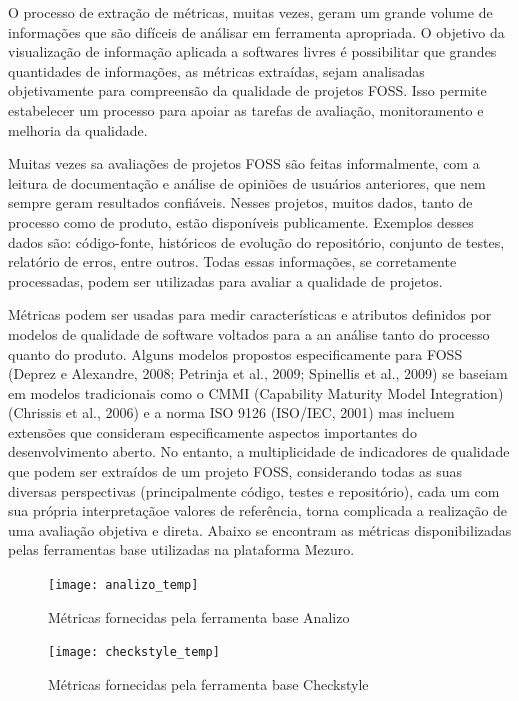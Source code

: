 O processo de extração de métricas, muitas vezes, geram um grande volume de informações que são difíceis de análisar em ferramenta apropriada. O objetivo da visualização de informação aplicada a softwares livres é possibilitar que grandes quantidades de informações, as métricas extraídas, sejam analisadas objetivamente para compreensão da qualidade de projetos FOSS. Isso permite estabelecer um processo para apoiar as tarefas de avaliação, monitoramento e melhoria da qualidade.

Muitas vezes sa avaliações de projetos FOSS são feitas informalmente, com a leitura de documentação e análise de opiniões de usuários anteriores, que nem sempre geram resultados confiáveis. Nesses projetos, muitos dados, tanto de processo como de produto, estão disponíveis publicamente. Exemplos desses dados são: código-fonte, históricos de evolução do repositório, conjunto de testes, relatório de erros, entre outros. Todas essas informações, se corretamente processadas, podem ser utilizadas para avaliar a qualidade de projetos. 

Métricas podem ser usadas para medir características e atributos definidos por modelos de qualidade de software voltados para a an análise tanto do processo quanto do produto. Alguns modelos propostos especificamente para FOSS (Deprez e Alexandre, 2008; Petrinja et al., 2009; Spinellis et al., 2009) se baseiam em modelos tradicionais como o CMMI (Capability Maturity Model Integration) (Chrissis et al., 2006) e a norma ISO 9126 (ISO/IEC, 2001) mas incluem extensões que consideram especificamente aspectos importantes do desenvolvimento aberto. No entanto, a multiplicidade de indicadores de qualidade que podem ser extraídos de um projeto FOSS, considerando todas as suas diversas perspectivas (principalmente código, testes e repositório), cada um com sua própria interpretaçãoe valores de referência, torna complicada a realização de uma avaliação objetiva e direta. Abaixo se encontram as métricas disponibilizadas pelas ferramentas base utilizadas na plataforma Mezuro.

\graphicspath{{figuras/}}
\begin{figure}[H]
\centering
\texttt{[image: analizo\_temp]}
\caption{Métricas fornecidas pela ferramenta base Analizo}
\label{fig-evolucaolinu}
\end{figure}

\graphicspath{{figuras/}}
\begin{figure}[H]
\centering
\texttt{[image: checkstyle\_temp]}
\caption{Métricas fornecidas pela ferramenta base Checkstyle}
\label{fig-evolucaolin}
\end{figure}

